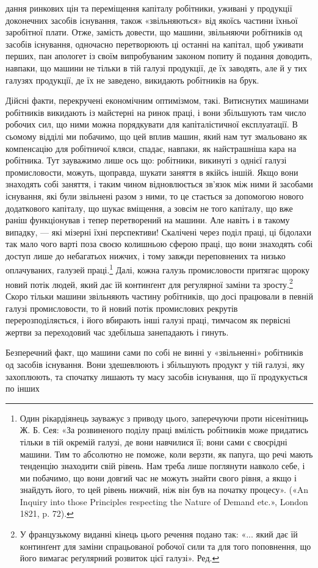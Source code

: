 дання ринкових цін та переміщення капіталу робітники, уживані
у продукції доконечних засобів існування, також «звільняються»
від якоїсь частини їхньої заробітної плати. Отже, замість
довести, що машини, звільняючи робітників од засобів існування,
одночасно перетворюють ці останні на капітал, щоб уживати
перших, пан апологет із своїм випробуваним законом попиту й
подання доводить, навпаки, що машини не тільки в тій галузі
продукції, де їх заводять, але й у тих галузях продукції, де їх
не заведено, викидають робітників на брук.

Дійсні факти, перекручені економічним оптимізмом, такі.
Витиснутих машинами робітників викидають із майстерні на
ринок праці, і вони збільшують там число робочих сил, що ними
можна порядкувати для капіталістичної експлуатації. В сьомому
відділі ми побачимо, що цей вплив машин, який нам тут змальовано
як компенсацію для робітничої кляси, спадає, навпаки, як
найстрашніша кара на робітника. Тут зауважимо лише ось
що: робітники, викинуті з однієї галузі промисловости, можуть,
щоправда, шукати заняття в якійсь іншій. Якщо вони знаходять
собі заняття, і таким чином відновлюється зв’язок між ними й
засобами існування, які були звільнені разом з ними, то це
стається за допомогою нового додаткового капіталу, що шукає
вміщення, а зовсім не того капіталу, що вже раніш функціонував
і тепер перетворений на машини. Але навіть і в такому випадку,
— які мізерні їхні перспективи! Скалічені через поділ праці,
ці бідолахи так мало чого варті поза своєю колишньою сферою
праці, що вони знаходять собі доступ лише до небагатьох нижчих,
і тому завжди переповнених та низько оплачуваних, галузей
праці.\footnote{
Один рікардіянець зауважує з приводу цього, заперечуючи проти
нісенітниць Ж. Б. Сея: «За розвиненого поділу праці вмілість робітників
може придатись тільки в тій окремій галузі, де вони навчилися її; вони
сами є своєрідні машини. Тим то абсолютно не поможе, коли верзти, як
папуга, що речі мають тенденцію знаходити свій рівень. Нам треба лише
поглянути навколо себе, і ми побачимо, що вони довгий час не можуть
знайти свого рівня, а якщо і знайдуть його, то цей рівень нижчий, ніж
він був на початку процесу». («An Inquiry into those Principles respecting
the Nature of Demand etc.», London 1821, p. 72).
} Далі, кожна галузь промисловости притягає щороку
новий потік людей, який дає їй континґент для регулярної заміни
та зросту.\footnote*{
У французькому виданні кінець цього речення подано так: «... який
дає їй континґент для заміни спрацьованої робочої сили та для того поповнення,
що його вимагає реґулярний розвиток цієї галузі». Ред.
} Скоро тільки машини звільняють частину робітників,
що досі працювали в певній галузі промисловости, то й новий
потік промислових рекрутів перерозподіляється, і його вбирають
інші галузі праці, тимчасом як первісні жертви за переходовий
час здебільша занепадають і гинуть.

Безперечний факт, що машини сами по собі не винні у «звільненні»
робітників од засобів існування. Вони здешевлюють і
збільшують продукт у тій галузі, яку захоплюють, та спочатку
лишають ту масу засобів існування, що її продукується по інших